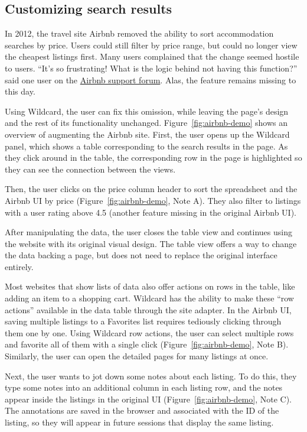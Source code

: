 \documentclass[english,submission]{programming}
\begin{document}
\hypertarget{customizing-search-results}{%
\subsection{Customizing search
results}\label{customizing-search-results}}

In 2012, the travel site Airbnb removed the ability to sort
accommodation searches by price. Users could still filter by price
range, but could no longer view the cheapest listings first. Many users
complained that the change seemed hostile to users. ``It's so
frustrating! What is the logic behind not having this function?'' said
one user on the
\href{https://community.withairbnb.com/t5/Hosting/Sorting-listing-by-price/td-p/559404}{Airbnb
support forum}. Alas, the feature remains missing to this day.

Using Wildcard, the user can fix this omission, while leaving the page's
design and the rest of its functionality unchanged.{
Figure~\ref{fig:airbnb-demo} shows an overview of augmenting the Airbnb
site.} First, the user opens up the Wildcard panel, which shows a table
corresponding to the search results in the page. As they click around in
the table, the corresponding row in the page is highlighted so they can
see the connection between the views.

Then, the user clicks on the price column header to sort the spreadsheet
and the Airbnb UI by price{ (Figure~\ref{fig:airbnb-demo}, Note A)}.
They also filter to listings with a user rating above 4.5 (another
feature missing in the original Airbnb UI).

After manipulating the data, the user closes the table view and
continues using the website with its original visual design. The table
view offers a way to change the data backing a page, but does not need
to replace the original interface entirely.

Most websites that show lists of data also offer actions on rows in the
table, like adding an item to a shopping cart. Wildcard has the ability
to make these ``row actions'' available in the data table through the
site adapter. In the Airbnb UI, saving multiple listings to a Favorites
list requires tediously clicking through them one by one. Using Wildcard
row actions, the user can select multiple rows and favorite all of them
with a single click{ (Figure~\ref{fig:airbnb-demo}, Note B)}. Similarly,
the user can open the detailed pages for many listings at once.

Next, the user wants to jot down some notes about each listing. To do
this, they type some notes into an additional column in each listing
row, and the notes appear inside the listings in the original UI{
(Figure~\ref{fig:airbnb-demo}, Note C)}. The annotations are saved in
the browser and associated with the ID of the listing, so they will
appear in future sessions that display the same listing.
\end{document}
